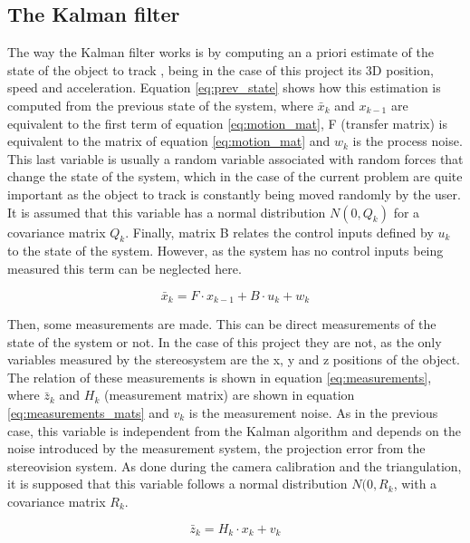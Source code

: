 \subsection{The Kalman filter}
The way the Kalman filter works is by computing an a priori estimate of the state of the object to track \cite{OReilly}, being in the case of this project its 3D position, speed and acceleration. Equation \eqref{eq:prev_state} shows how this estimation is computed from the previous state of the system, where $\bar{x}_{k}$ and $x_{k-1}$ are equivalent to the first term of equation \eqref{eq:motion_mat}, F (transfer matrix) is equivalent to the matrix of equation \eqref{eq:motion_mat} and $w_{k}$ is the process noise. This last variable is usually a random variable associated with random forces that change the state of the system, which in the case of the current problem are quite important as the object to track is constantly being moved randomly by the user. It is assumed that this variable has a normal distribution $N(0,Q_{k})$ for a covariance matrix $Q_{k}$.
Finally, matrix B relates the control inputs defined by $u_{k}$ to the state of the system. However, as the system has no control inputs being measured this term can be neglected here.

\begin{equation}
\bar{x}_{k}=F \cdot x_{k-1}+B \cdot u_{k}+w_{k}
\label{eq:prev_state}
\end{equation}

Then, some measurements are made. This can be direct measurements of the state of the system or not. In the case of this project they are not, as the only variables measured by the stereosystem are the x, y and z positions of the object. The relation of these measurements is shown in equation \eqref{eq:measurements}, where $\bar{z}_{k}$ and $H_{k}$ (measurement matrix) are shown in equation \eqref{eq:measurements_mats} and $v_{k}$ is the measurement noise. As in the previous case, this variable is independent from the Kalman algorithm and depends on the noise introduced by the measurement system, the projection error from the stereovision system. As done during the camera calibration and the triangulation, it is  supposed that this variable follows a normal distribution $N(0,R_{k}$, with a covariance matrix $R_{k}$.

\begin{equation}
\bar{z}_{k}=H_{k} \cdot x_{k}+v_{k}
\label{eq:measurements}
\end{equation}

